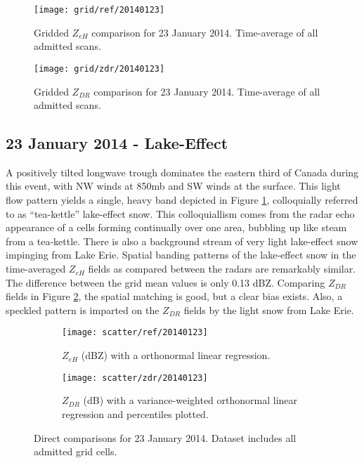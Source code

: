 \begin{figure}[p]
\texttt{[image: grid/ref/20140123]}
\caption{Gridded $Z_{eH}$ comparison for 23 January 2014. Time-average of all admitted scans.} 
\label{fig:grid_ref_20140123}
\end{figure}

\begin{figure}[p]
\texttt{[image: grid/zdr/20140123]}
\caption{Gridded $Z_{DR}$ comparison for 23 January 2014. Time-average of all admitted scans.} 
\label{fig:grid_zdr_20140123}
\end{figure}

\subsection{23 January 2014 - Lake-Effect}
A positively tilted longwave trough dominates the eastern third of Canada during this event, with NW
winds at 850mb and SW winds at the surface. This light flow pattern yields a single, heavy
band depicted in Figure \ref{fig:grid_ref_20140123}, colloquially referred to as ``tea-kettle'' lake-effect
snow. This colloquiallism comes from the radar echo appearance of a cells forming continually over one area, bubbling up like steam from a tea-kettle. There is also a background stream of very light lake-effect snow impinging from Lake Erie.
Spatial banding patterns of the lake-effect snow in the time-averaged $Z_{eH}$ fields as compared 
between the radars are remarkably similar. The difference between the grid mean values is only
0.13 dBZ. Comparing $Z_{DR}$ fields in Figure \ref{fig:grid_zdr_20140123}, the spatial matching is good, but a clear bias exists. Also, a speckled pattern is imparted on the $Z_{DR}$ fields
by the light snow from Lake Erie. 
\begin{figure}[H]
\centering
   \begin{subfigure}[t]{0.48\linewidth} \centering
     \texttt{[image: scatter/ref/20140123]}
     \caption{$Z_{eH}$ (dBZ) with a orthonormal linear regression.}\label{fig:scatter_ref_20140123}
   \end{subfigure}
   \begin{subfigure}[t]{0.48\linewidth} \centering
     \texttt{[image: scatter/zdr/20140123]}
     \caption{$Z_{DR}$ (dB) with a variance-weighted orthonormal linear regression and percentiles plotted.}\label{fig:scatter_zdr_20140123}
   \end{subfigure}
\caption{Direct comparisons for 23 January 2014. Dataset includes all admitted grid cells.}
\label{fig:scatter_20140123}
\end{figure}
